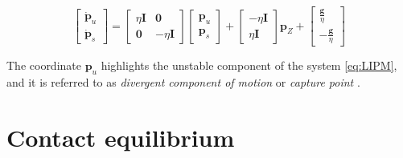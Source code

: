 \begin{equation*}
    \begin{bmatrix}
        \dot{\bm{p}}_u \\ \dot{\bm{p}}_s
    \end{bmatrix}
    =
    \begin{bmatrix}
        \eta\bm{I} &  \bm{0} \\
        \bm{0} & -\eta\bm{I}
    \end{bmatrix}
    \begin{bmatrix}
        \bm{p}_u \\ \bm{p}_s
    \end{bmatrix}
    +
    \begin{bmatrix}
        -\eta \bm{I} \\ \eta \bm{I}
    \end{bmatrix}
    \bm{p}_Z 
    +
    \begin{bmatrix}
        \frac{\bm{g}}{\eta} \\ -\frac{\bm{g}}{\eta}
    \end{bmatrix}
\end{equation*}

The coordinate $\bm{p}_u$ highlights the unstable component of the system
\eqref{eq:LIPM}, and it is referred to as \textit{divergent component of motion}
\cite{Englsberger2015TRO} or \textit{capture point}
\cite{Pratt2006CapturePoint}.

\section{Contact equilibrium}
%
%

